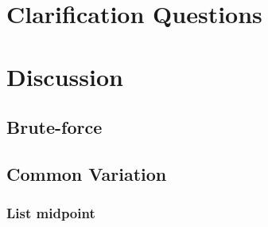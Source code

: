 \section{Clarification Questions}

\begin{QandA}
	\item 
	\begin{answered}
		\textit{}
	\end{answered}
	
\end{QandA}

\section{Discussion}
\label{node_from_the_end:sec:discussion}


\subsection{Brute-force}
\label{node_from_the_end:sec:bruteforce}





\subsection{Common Variation }
\subsubsection{List midpoint}
\label{node_from_the_end:sec:list_midpoint}
